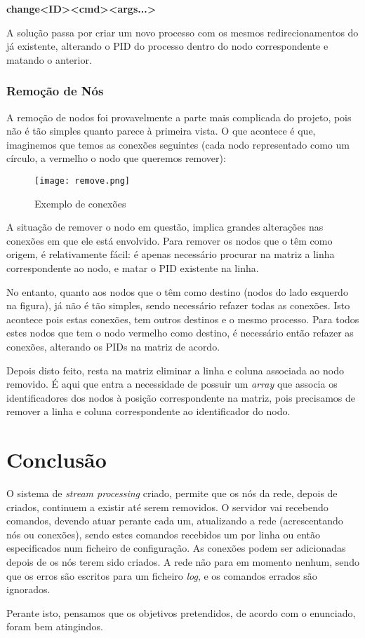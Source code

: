 \documentclass[a4paper]{article}
\begin{document}
\textbf{change\textless ID\textgreater\textless cmd\textgreater\textless args...\textgreater}

A solução passa por criar um novo processo com os mesmos redirecionamentos do já existente, alterando o PID do processo dentro do nodo correspondente e matando o anterior.

\subsubsection{Remoção de Nós}

A remoção de nodos foi provavelmente a parte mais complicada do projeto, pois não é tão simples quanto parece à primeira vista. O que acontece é que, imaginemos que temos as conexões seguintes (cada nodo representado como um círculo, a vermelho o nodo que queremos remover):

\begin{figure}[H]
	\centering
	\texttt{[image: remove.png]}
	\caption{Exemplo de conexões}
	\label{fig:remove}
\end{figure}

A situação de remover o nodo em questão, implica grandes alterações nas conexões em que ele está envolvido. Para remover os nodos que o têm como origem, é relativamente fácil: é apenas necessário procurar na matriz a linha correspondente ao nodo, e matar o PID existente na linha.

No entanto, quanto aos nodos que o têm como destino (nodos do lado esquerdo na figura), já não é tão simples, sendo necessário refazer todas as conexões. Isto acontece pois estas conexões, tem outros destinos e o mesmo processo. Para todos estes nodos que tem o nodo vermelho como destino, é necessário então refazer as conexões, alterando os PIDs na matriz de acordo.

Depois disto feito, resta na matriz eliminar a linha e coluna associada ao nodo removido. É aqui que entra a necessidade de possuir um \textit{array} que associa os identificadores dos nodos à posição correspondente na matriz, pois precisamos de remover a linha e coluna correspondente ao identificador do nodo.

\section{Conclusão}


O sistema de \textit{stream processing} criado, permite que os nós da rede, depois de criados, continuem a existir até serem removidos. O servidor vai recebendo comandos, devendo atuar perante cada um, atualizando a rede (acrescentando nós ou conexões), sendo estes comandos recebidos um por linha ou então especificados num ficheiro de configuração. As conexões podem ser adicionadas depois de os nós terem sido criados. A rede não para em momento nenhum, sendo que os erros são escritos para um ficheiro \textit{log}, e os comandos errados são ignorados.

Perante isto, pensamos que os objetivos pretendidos, de acordo com o enunciado, foram bem atingindos.
\end{document}
